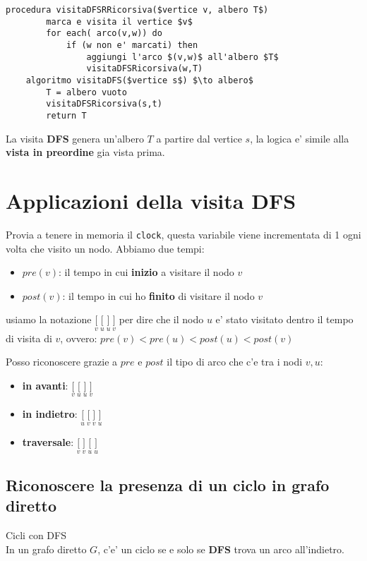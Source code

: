 \begin{lstlisting}[mathescape=true]
    procedura visitaDFSRRicorsiva($vertice v, albero T$)
        marca e visita il vertice $v$
        for each( arco(v,w)) do
            if (w non e' marcati) then  
                aggiungi l'arco $(v,w)$ all'albero $T$
                visitaDFSRicorsiva(w,T)
    algoritmo visitaDFS($vertice s$) $\to albero$
        T = albero vuoto
        visitaDFSRicorsiva(s,t)
        return T
\end{lstlisting}

La visita \textbf{DFS} genera un'albero $T$ a partire dal vertice $s$,
la logica e' simile alla \textbf{vista in preordine} gia vista prima.

\newpage
\section{Applicazioni della visita DFS}
Provia a tenere in memoria il \texttt{clock}, questa variabile viene incrementata di
1 ogni volta che visito un nodo. Abbiamo due tempi:
\begin{itemize}
    \item $pre(v)$: il tempo in cui \textbf{inizio} a visitare il nodo $v$
    \item $post(v)$: il tempo in cui ho \textbf{finito} di visitare il nodo $v$
\end{itemize}

usiamo la notazione $\underset{v}{[} \ \underset{u}{[} \ \underset{u}{]} \ \underset{v}{]}$ per dire che il nodo $u$ e'
stato visitato dentro il tempo di visita di $v$, ovvero: $pre(v) < pre(u) < post(u) < post(v)$

Posso riconoscere grazie a $pre$ e $post$ il tipo di arco che c'e tra i nodi $v, u$:
\begin{itemize}
    \item \textbf{in avanti}: $\underset{v}{[} \ \underset{u}{[} \ \underset{u}{]} \ \underset{v}{]}$
    \item \textbf{in indietro}: $\underset{u}{[} \ \underset{v}{[} \ \underset{v}{]} \ \underset{u}{]}$
    \item \textbf{traversale}: $\underset{v}{[} \ \underset{v}{]} \ \underset{u}{[} \ \underset{u}{]}$
\end{itemize}

\subsection{Riconoscere la presenza di un ciclo in grafo diretto}
\begin{definition} Cicli con DFS \\
    In un grafo diretto $G$, c'e' un ciclo se e solo se \textbf{DFS} trova
    un arco all'indietro.
\end{definition}

